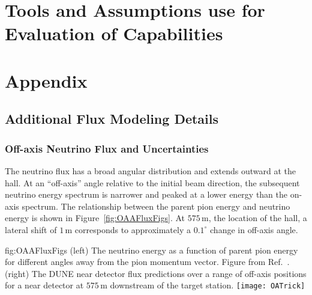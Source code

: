 \section{Tools and Assumptions use for Evaluation of  Capabilities}
\label{sec:tools-nd-eval}


\section{Appendix}
\label{sec:tools-appendix}

\subsection{Additional Flux Modeling Details}
\label{sec:tools-app-flx}

\subsubsection{Off-axis Neutrino Flux and Uncertainties}
\label{sec:tools-app-flx-offaxis}

The neutrino flux has a broad angular distribution and extends outward at the  hall. At an ``off-axis'' angle relative to the initial beam direction, the subsequent neutrino energy spectrum is narrower and peaked at a lower energy than the on-axis spectrum.
The relationship between the parent pion energy and neutrino energy is shown in Figure~\ref{fig:OAAFluxFigs}.  At $575\,\textrm{m}$, the location of the  hall, a lateral shift of $1\,\textrm{m}$ corresponds to approximately a $0.1^\circ$ change in off-axis angle.

\begin{dunefigure}{fig:OAAFluxFigs}
{(left) The neutrino energy as a function of parent pion energy for different angles away from the pion momentum vector. Figure from Ref.~\cite{Duffy:2016owt}. (right) The DUNE near detector flux predictions over a range of off-axis positions for a near detector at $575\,\textrm{m}$ downstream of the target station. }
    \texttt{[image: OATrick]}
\end{dunefigure}

